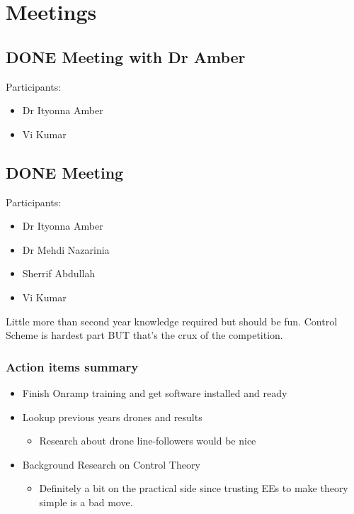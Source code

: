 \documentclass[11pt]{article}
\date{\today}
\title{}
\begin{document}
\tableofcontents

\section{Meetings}
\label{sec:org67b957e}
\subsection{{\bfseries\sffamily DONE} Meeting with Dr Amber}
\label{sec:org9b91afc}
Participants:
\begin{itemize}
\item Dr Ityonna Amber
\item Vi Kumar
\end{itemize}

\subsection{{\bfseries\sffamily DONE} Meeting}
\label{sec:orgc07af9a}
Participants:
\begin{itemize}
\item Dr Ityonna Amber
\item Dr Mehdi Nazarinia
\item Sherrif Abdullah
\item Vi Kumar
\end{itemize}

Little more than second year knowledge required but should be fun.
Control Scheme is hardest part BUT that's the crux of the competition.

\subsubsection{Action items summary}
\label{sec:org1d754ce}
\begin{itemize}
\item Finish Onramp training and get software installed and ready
\item Lookup previous years drones and results
\begin{itemize}
\item Research about drone line-followers would be nice
\end{itemize}
\item Background Research on Control Theory
\begin{itemize}
\item Definitely a bit on the practical side since trusting EEs to make theory simple is a bad move.
\end{itemize}
\end{itemize}
\end{document}

